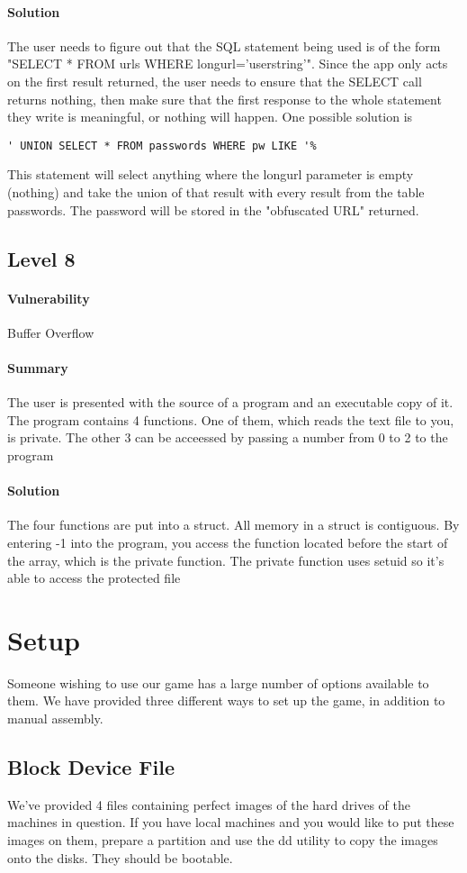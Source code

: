 \documentclass[12pt]{article}
\begin{document}
\paragraph{Solution} The user needs to figure out that the SQL statement being used is of the form 
"SELECT * FROM urls WHERE longurl='userstring'".  Since the app only acts on the first result returned, the
user needs to ensure that the SELECT call returns nothing, then make sure that the first response to the whole
statement they write is meaningful, or nothing will happen.  One possible solution is 
\begin{verbatim} 
' UNION SELECT * FROM passwords WHERE pw LIKE '%
\end{verbatim}
This statement will select anything where the longurl parameter is empty (nothing) and take the union of that
result with every result from the table passwords.  The password will be stored in the "obfuscated URL" returned.
\subsection{Level 8}
\paragraph{Vulnerability} Buffer Overflow
\paragraph{Summary} The user is presented with the source of a program and an
executable copy of it. The program contains 4 functions. One of them, which
reads the text file to you, is private. The other 3 can be acceessed by passing
a number from 0 to 2 to the program
\paragraph{Solution} The four functions are put into a struct. All memory in a
struct is contiguous. By entering -1 into the program, you access the function
located before the start of the array, which is the private function. The
private function uses setuid so it's able to access the protected file
\section{Setup}
Someone wishing to use our game has a large number of options available to them.  We have provided three different ways to set up the game, in addition to manual assembly.
\subsection{Block Device File}
We've provided 4 files containing perfect images of the hard drives of the machines in question.  If you have local machines and you would like to put these images on them, prepare a partition and use the dd utility to copy the images onto the disks.  They should be bootable.
\end{document}
